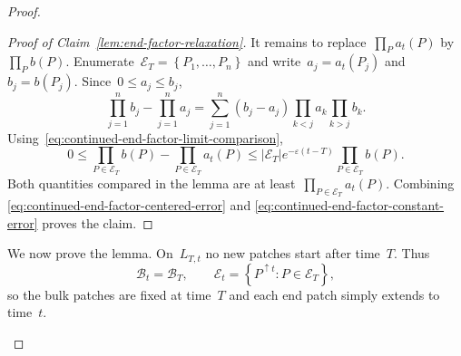 \documentclass[EJP,preprint,NODS,nobera]{ejpecp}
\newcommand{\bb}[1]{\left(#1\right)}
\newcommand{\cb}[1]{\left\{#1\right\}}
\newcommand{\abs}[1]{\left|#1\right|}
\begin{document}
\begin{proof}
\begin{proof}[Proof of Claim~\ref{lem:end-factor-relaxation}]
It remains to replace~$\prod_Pa_t(P)$ by~$\prod_Pb(P)$. Enumerate~$\mathcal E_T=\cb{P_1,\ldots,P_n}$ and write~$a_j=a_t(P_j)$ and~$b_j=b(P_j)$. Since~$0\leq a_j\leq b_j$,
\begin{equation*}
\prod_{j=1}^n b_j-\prod_{j=1}^n a_j
=
\sum_{j=1}^n
\bb{b_j-a_j}
\prod_{k<j}a_k
\prod_{k>j}b_k.
\end{equation*}
Using~\eqref{eq:continued-end-factor-limit-comparison},
\begin{equation}
\label{eq:continued-end-factor-constant-error}
0
\leq
\prod_{P\in\mathcal E_T}b(P)
-
\prod_{P\in\mathcal E_T}a_t(P)
\leq
\abs{\mathcal E_T}e^{-\varepsilon(t-T)}
\prod_{P\in\mathcal E_T}b(P).
\end{equation}
Both quantities compared in the lemma are at least~$\prod_{P\in\mathcal E_T}a_t(P)$. Combining
\eqref{eq:continued-end-factor-centered-error} and
\eqref{eq:continued-end-factor-constant-error} proves the claim.
\end{proof}

We now prove the lemma.
On~$L_{T,t}$ no new patches start after time~$T$. Thus
\begin{equation*}
\mathcal B_t=\mathcal B_T,
\qquad
\mathcal E_t
=
\cb{P^{\uparrow t}:P\in\mathcal E_T},
\end{equation*}
so the bulk patches are fixed at time~$T$ and each end patch simply extends to
time~$t$.

\begin{figure}[htbp]
\centering
\begingroup
{}
\end{figure}
\end{proof}
\end{document}
